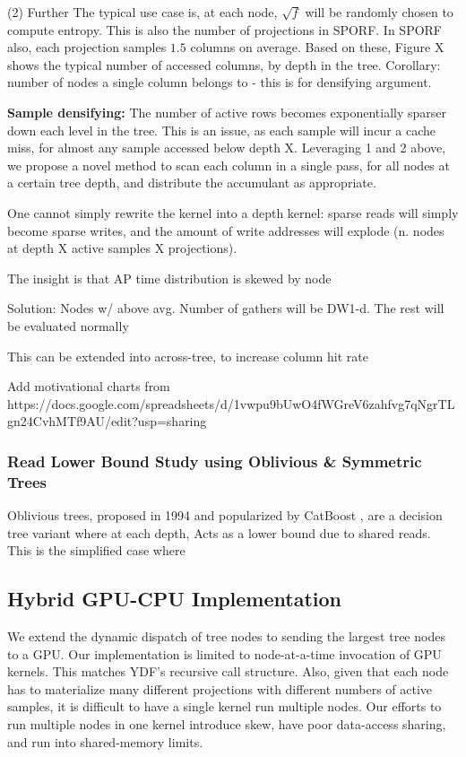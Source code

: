 \documentclass[sigconf]{acmart}
\begin{document}
(2) Further The typical use case is, at each node, $\sqrt{f}$ will be randomly chosen to compute entropy. This is also the number of projections in SPORF. In SPORF also, each projection samples $1.5$ columns on average. Based on these, Figure X shows the typical number of accessed columns, by depth in the tree. Corollary: number of nodes a single column belongs to - this is for densifying argument.

\textbf{Sample densifying:} The number of active rows becomes exponentially sparser down each level in the tree. This is an issue, as each sample will incur a cache miss, for almost any sample accessed below depth X. Leveraging 1 and 2 above, we propose a novel method to scan each column in a single pass, for all nodes at a certain tree depth, and distribute the accumulant as appropriate.



One cannot simply rewrite the kernel into a depth kernel: sparse reads will simply become sparse writes, and the amount of write addresses will explode (n. nodes at depth X active samples X projections).

    The insight is that AP time distribution is skewed by node

        Solution: Nodes w/ above avg. Number of gathers will be DW1-d. The rest will be evaluated normally

This can be extended into across-tree, to increase column hit rate

Add motivational charts from https://docs.google.com/spreadsheets/d/1vwpu9bUwO4fWGreV6zahfvg7qNgrTLgn24CvhMTf9AU/edit?usp=sharing


\subsubsection{Read Lower Bound Study using Oblivious \& Symmetric Trees}


Oblivious trees, proposed in 1994 \cite{} and popularized by CatBoost \cite{prokhorenkova2018catboost}, are a decision tree variant where at each depth, 
Acts as a lower bound due to shared reads. This is the simplified case where 


\subsection{Hybrid GPU-CPU Implementation}
We extend the dynamic dispatch of tree nodes to sending the largest tree nodes to a GPU.  Our implementation is limited to node-at-a-time invocation of GPU kernels. This matches YDF's recursive call structure. Also, given that each node has to materialize many different projections with different numbers of active samples, it is difficult to have a single kernel run multiple nodes. Our efforts to run multiple nodes in one kernel introduce skew, have poor data-access sharing, and run into shared-memory limits.
\end{document}
